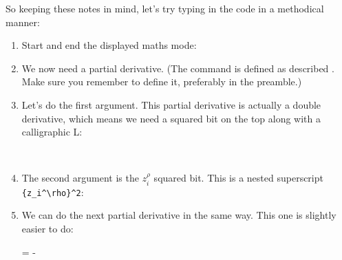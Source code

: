 So keeping these notes in mind, let's try typing in the code in a
methodical manner:\screenpagebreak
\begin{enumerate}
\item Start and end the displayed maths mode:
\begin{code}
\newline
{}
\end{code}

\item We now need a partial derivative.
(The command  is defined as described
. Make sure you remember to define it,
preferably in the \gls{preamble}.)
\begin{code}
{\color{midgray}
}\newline
{}\marg{}\marg{}\newline
{\color{midgray}
}
\end{code}

\item Let's do the first argument. This partial derivative is
actually a double derivative, which means we need a squared bit on
the top along with a calligraphic L:
\begin{code}
\begin{alltt}
{\color{midgray}
\marg*{}
}
\end{alltt}
\end{code}

\item The second argument is the $z_i^\rho$ squared bit.  This is a 
nested superscript
\verb|{z_i^\rho}^2|:
\begin{code}
\begin{alltt}
\color{midgray}
\end{alltt}
\end{code}

\item We can do the next partial derivative in the same way.  This 
one is slightly easier to do:
\begin{code}
{\color{midgray}\newline
{}} =\newline
-\newline
{\color{midgray}}
\end{code}


\end{enumerate}
